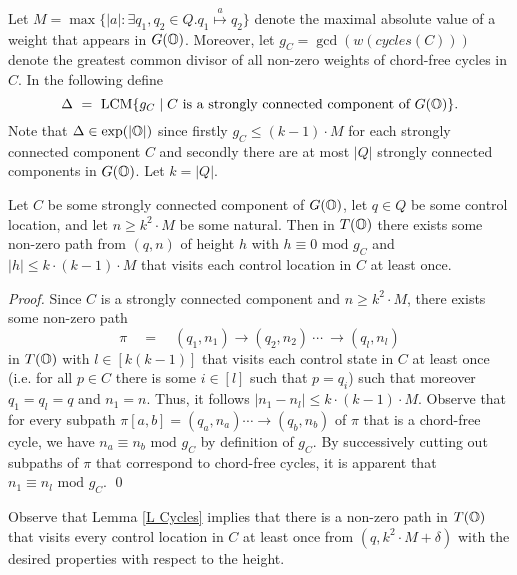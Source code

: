 \documentclass[times,envcountsame]{llncs}
\newcommand{\LCM}{\text{LCM}}
\begin{document}
Let $M=\max\{|a|:\exists q_1,q_2\in Q. q_1\stackrel{a}{\mapsto}q_2\}$
denote the maximal absolute value of a weight that appears in $G(\mathbb{O})$.
Moreover, let $g_C=\gcd(w(cycles(C)))$ denote the greatest common divisor
of all non-zero weights of chord-free cycles in $C$.
In the following define $$\Delta\ =\ \LCM\{g_C\mid C\text{ is a strongly
connected component of } G(\O)\}.$$
\noindent
Note that $\Delta\in\exp(|\mathbb{O}|)$ since firstly $g_C\leq (k-1)\cdot M$ for each strongly
connected component $C$ and secondly there are at most $|Q|$
strongly connected components in $G(\mathbb{O})$.
Let $k=|Q|$.


\begin{lemma}{\label{L Cycles}}
Let $C$ be some strongly connected component of $G(\mathbb{O})$, let $q\in Q$ be some
control location, and let $n\geq k^2\cdot M$ be some natural.
Then in $T(\mathbb{O})$ there exists some non-zero path from $(q,n)$ of height $h$ with $h\equiv
0\text{ mod }g_C$ and $|h|\leq k\cdot(k-1)\cdot M$  that visits each
control location in $C$ at least once.
\end{lemma}
\begin{proof}
Since $C$ is a strongly connected component and $n\geq k^2\cdot M$, there exists some
non-zero path
$$
\pi\quad =\quad(q_1,n_1)\rightarrow(q_2,n_2)\ \cdots\ \rightarrow (q_l,n_l)
$$
in $T(\mathbb{O})$ with $l\in[k(k-1)]$ that visits each control state in $C$ at least once
(i.e. for all $p\in C$ there is some $i\in[l]$ such that $p=q_i$) such that
moreover $q_1=q_l=q$ and $n_1=n$. Thus, it follows $|n_1-n_l|\leq k\cdot
(k-1)\cdot M$.
Observe that for every subpath $\pi[a,b]=(q_a,n_a)\cdots\rightarrow(q_b,n_b)$ of $\pi$ that is a chord-free
cycle, we have $n_a\equiv n_b\text{ mod } g_C$ by definition of $g_C$.
By successively cutting out subpaths of $\pi$ that correspond to chord-free
cycles, it is apparent that $n_1\equiv n_l\text{ mod }g_C$.
\qed
\end{proof}

Observe that Lemma \ref{L Cycles} implies that there is a non-zero path in
$T(\mathbb{O})$ that visits every
control location in $C$ at least once from $(q,k^2\cdot M+\delta)$ with the
desired properties with respect to the height.
\end{document}
